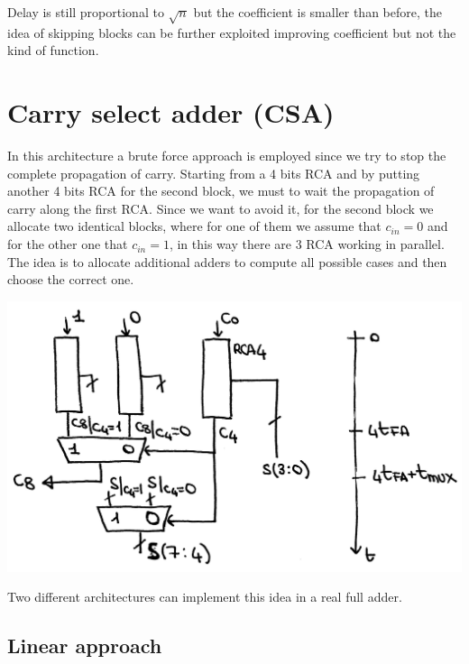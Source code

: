 Delay is still proportional to $\sqrt{n}$ but the coefficient is smaller than
before, the idea of skipping blocks can be further exploited improving
coefficient but not the kind of function.


 \section{Carry select adder (CSA)}
 In this architecture a brute force approach is employed since we try to stop
 the complete propagation of carry. Starting from a 4 bits RCA and by putting
 another 4 bits RCA for the second block, we must to wait the propagation of
 carry along the first RCA. Since we want to avoid it, for the second block we
 allocate two identical blocks, where for one of them we assume that $c_{in}=0$
 and for the other one that $c_{in}=1$, in this way there are 3 RCA working in
 parallel. The idea is to allocate additional adders to compute all possible
 cases and then choose the correct one.

\begin{center}
  \includegraphics[width=0.7\linewidth]{img/img2/7}
\end{center}


 Two different architectures can implement this idea in a real full adder.


\subsection{Linear approach}

